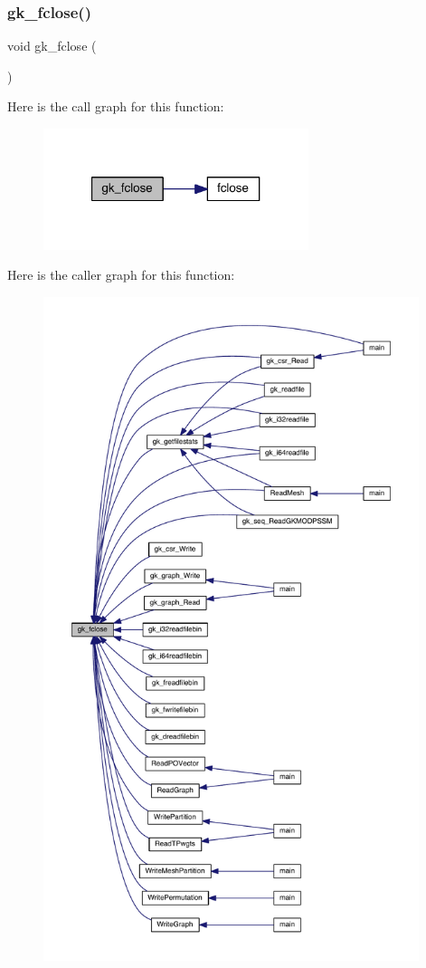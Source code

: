 \subsubsection{\texorpdfstring{gk\+\_\+fclose()}{gk\_fclose()}}
{\footnotesize\ttfamily void gk\+\_\+fclose (\begin{DoxyParamCaption}\item[{F\+I\+LE $\ast$}]{ }\end{DoxyParamCaption})}

Here is the call graph for this function\+:\nopagebreak
\begin{figure}[H]
\begin{center}
\leavevmode
\includegraphics[width=220pt]{a00077_a0fd03cab5187904b005485109d9fa2b5_cgraph}
\end{center}
\end{figure}
Here is the caller graph for this function\+:\nopagebreak
\begin{figure}[H]
\begin{center}
\leavevmode
\includegraphics[height=550pt]{a00077_a0fd03cab5187904b005485109d9fa2b5_icgraph}
\end{center}
\end{figure}
